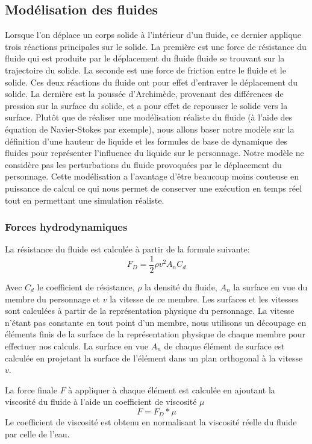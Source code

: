 \documentclass[runningheads,a4paper]{llncs}
\begin{document}
\subsection{Modélisation des fluides}
%
\label{sec:model_fluide}
Lorsque l'on déplace un corps solide à l'intérieur d'un fluide, ce dernier applique trois réactions principales sur le solide. La première est une force de résistance du fluide qui est produite par le déplacement du fluide fluide se trouvant sur la trajectoire du solide. La seconde est une force de friction entre le fluide et le solide. Ces deux réactions du fluide ont pour effet d'entraver le déplacement du solide. La dernière est la poussée d'Archimède, provenant des différences de pression sur la surface du solide, et a pour effet de repousser le solide vers la surface.
Plutôt que de réaliser une modélisation réaliste du fluide (à l'aide des équation de Navier-Stokes par exemple), nous allons baser notre modèle sur la définition d'une hauteur de liquide et les formules de base de dynamique des fluides pour représenter l'influence du liquide sur le personnage. Notre modèle ne considère pas les perturbations du fluide provoquées par le déplacement du personnage. Cette modélisation a l'avantage d'être beaucoup moins couteuse en puissance de calcul ce qui nous permet de conserver une exécution en temps réel tout en permettant une simulation réaliste.
%
\subsubsection{Forces hydrodynamiques}
%
La résistance du fluide est calculée à partir de la formule suivante:
\[
F_D=\frac{1}{2} \rho v^2 A_n C_d
\]


Avec \(C_d\) le coefficient de résistance, \(\rho\) la densité du fluide, \(A_n\) la surface en vue du membre du personnage et \(v\) la vitesse de ce membre. Les surfaces et les vitesses sont calculées à partir de la représentation physique du personnage. La vitesse n'étant pas constante en tout point d'un membre, nous utilisons un découpage en éléments finis de la surface de la représentation physique de chaque membre pour effectuer nos calculs. La surface en vue $A_n$ de chaque élément de surface est calculée en projetant la surface de l'élément dans un plan orthogonal à la vitesse $v$. 

La force finale $F$ à appliquer à chaque élément est calculée en ajoutant la viscosité du fluide à l'aide un coefficient de viscosité $\mu$ 
\[
F=F_D*\mu
\]
Le coefficient de viscosité est obtenu en normalisant la viscosité réelle du fluide par celle de l'eau.
%
\end{document}
